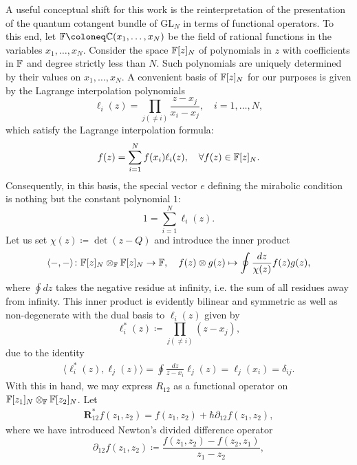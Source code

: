 A useful conceptual shift for this work is the reinterpretation of the presentation of the quantum cotangent bundle of $\mathrm{GL}_N$ in terms of functional operators. To this end, let $\F \coloneq \C(x_1,\dots,x_N)$ be the field of rational functions in the variables $x_1,\dots,x_N$. Consider the space $\mathbb{F}[z]_N$ of polynomials in $z$ with coefficients in $\mathbb{F}$ and degree strictly less than $N$. Such polynomials are uniquely determined by their values on $x_1,\dots,x_N$. A convenient basis of $\mathbb{F}[z]_N$ for our purposes is given by the Lagrange interpolation polynomials
\begin{equation}
\ell_i(z) = \prod_{j(\neq i)} \frac{z-x_j}{x_i-x_j}, \quad i=1,\dots,N,
\end{equation}
which satisfy the Lagrange interpolation formula:
\begin{equation}
f(z) = \sum_{i=1}^N f(x_i) \ell_i(z), \quad \forall f(z) \in \mathbb{F}[z]_N.
\end{equation}
Consequently, in this basis, the special vector $e$ defining the mirabolic condition is nothing but the constant polynomial $1$:
\begin{equation}
    1 = \sum_{i=1}^N \ell_i(z).
\end{equation}
Let us set $\chi(z) \coloneq \det(z-Q)$ and introduce the inner product
\begin{equation}
\langle -,- \rangle \colon \mathbb{F}[z]_N \otimes_{\mathbb{F}} \mathbb{F}[z]_N \to \mathbb{F}, \quad f(z) \otimes g(z) \mapsto \oint \frac{dz}{\chi(z)} f(z) g(z),
\end{equation}
where $\oint dz$ takes the negative residue at infinity, i.e. the sum of all residues away from infinity. This inner product is evidently bilinear and symmetric as well as non-degenerate with the dual basis to $\ell_i(z)$ given by
\begin{equation}
\ell_i^*(z) \coloneq \prod_{j(\neq i)} (z-x_j),
\end{equation}
due to the identity
\begin{align}
\langle \ell_i^*(z), \ell_j(z) \rangle = \oint \frac{dz}{z-x_i} \ell_j(z) = \ell_j(x_i) = \delta_{ij}.
\end{align}
With this in hand, we may express $R_{12}$ as a functional operator on $\mathbb{F}[z_1]_N \otimes_{\mathbb{F}} \mathbb{F}[z_2]_N$. Let
\begin{align}
\mathbf{R}_{12}^* f(z_1,z_2) = f(z_1,z_2) + \hbar \partial_{12} f(z_1,z_2),
\end{align}
where we have introduced Newton's divided difference operator
\begin{equation}
\partial_{12} f(z_1,z_2) \coloneq \frac{f(z_1,z_2)-f(z_2,z_1)}{z_1-z_2},
\end{equation}
